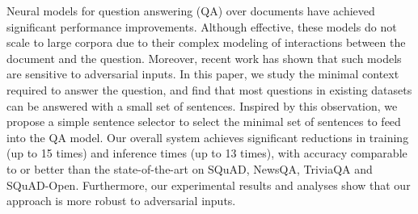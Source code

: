 Neural models for question answering (QA) over documents have achieved significant performance improvements. Although effective, these models do not scale to large corpora due to their complex modeling of interactions between the document and the question. Moreover, recent work has shown that such models are sensitive to adversarial inputs. In this paper, we study the minimal context required to answer the question, and find that most questions in existing datasets can be answered with a small set of sentences. Inspired by this observation, we propose a simple sentence selector to select the minimal set of sentences to feed into the QA model. Our overall system achieves significant reductions in training (up to 15 times) and inference times (up to 13 times), with accuracy comparable to or better than the state-of-the-art on SQuAD, NewsQA, TriviaQA and SQuAD-Open. Furthermore, our experimental results and analyses show that our approach is more robust to adversarial inputs.
